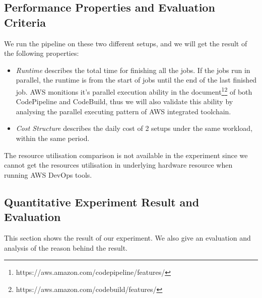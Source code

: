 \subsection{Performance Properties and Evaluation Criteria}
We run the pipeline on these two different setups, and we will get the result of the following properties:
\begin{itemize}
\item \textit{Runtime} describes the total time for finishing all the jobs. If the jobs run in parallel, the runtime is from the start of jobs until the end of the last finished job. AWS monitions it's parallel execution ability in the document\footnote{https://aws.amazon.com/codepipeline/features/}\footnote{https://aws.amazon.com/codebuild/features/} of both CodePipeline and CodeBuild, thus we will also validate this ability by analysing the parallel executing pattern of AWS integrated toolchain. \label{aws_parallel}
\item \textit{Cost Structure} describes the daily cost of 2 setups under the same workload, within the same period.
\end{itemize}
The resource utilisation comparison is not available in the experiment since we cannot get the resources utilisation in underlying hardware resource when running AWS DevOps tools.
\subsection{Quantitative Experiment Result and Evaluation}
This section shows the result of our experiment. We also give an evaluation and analysis of the reason behind the result.
